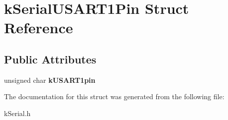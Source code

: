\hypertarget{structkSerialUSART1Pin}{}\section{k\+Serial\+U\+S\+A\+R\+T1\+Pin Struct Reference}
\label{structkSerialUSART1Pin}
\subsection*{Public Attributes}
\begin{DoxyCompactItemize}
\item 
unsigned char {\bfseries k\+U\+S\+A\+R\+T1pin}\hypertarget{structkSerialUSART1Pin_a83201f29fc682f07cded089dfeab3e51}{}\label{structkSerialUSART1Pin_a83201f29fc682f07cded089dfeab3e51}

\end{DoxyCompactItemize}


The documentation for this struct was generated from the following file\+:\begin{DoxyCompactItemize}
\item 
k\+Serial.\+h\end{DoxyCompactItemize}
